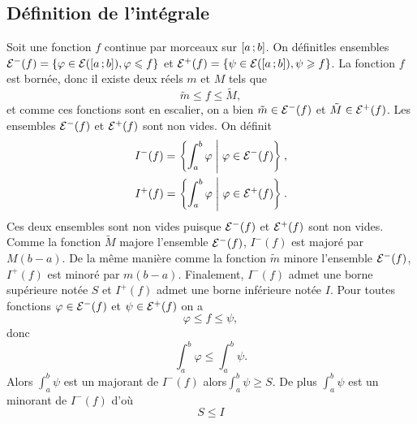 \subsection{Définition de l'intégrale}

Soit une fonction $f$ continue par morceaux sur $\left[ a \, ;  b \right]$. On définitles ensembles $\mathcal{E}^{-}(f)=\{\varphi \in \mathcal{E}(\left[ a \, ;  b \right]), \varphi \leqslant f\}$ et $\mathcal{E}^{+}(f)=\{\psi \in \mathcal{E}(\left[ a \, ;  b \right]), \psi \geqslant f\}$. La fonction $f$ est bornée, donc il existe deux réels $m$ et $M$ tels que 
\begin{equation}
  \tilde{m} \leqslant f \leqslant \tilde{M},
\end{equation}
et comme ces fonctions sont en escalier, on a bien $\tilde{m} \in \mathcal{E}^{-}(f)$ et $\tilde{M} \in \mathcal{E}^{+}(f)$. Les ensembles $\mathcal{E}^{-}(f)$ et $\mathcal{E}^{+}(f)$ sont non vides. On définit 
\begin{align}
I^{-}(f)=\left\{\int_a^b \varphi\mathrel{}\middle|\mathrel{}\varphi \in \mathcal{E}^{-}(f)\right\}, \\
I^{+}(f)=\left\{\int_a^b \varphi\mathrel{}\middle|\mathrel{}\varphi \in \mathcal{E}^{+}(f)\right\}.
\end{align}
 Ces deux ensembles sont non vides puisque $\mathcal{E}^{-}(f)$ et $\mathcal{E}^{+}(f)$ sont non vides. Comme la fonction $\tilde{M}$ majore l'ensemble $\mathcal{E}^{-}(f)$, $I^{-}(f)$ est majoré par $M(b-a)$. De la même manière comme la fonction $\tilde{m}$ minore l'ensemble $\mathcal{E}^{-}(f)$, $I^{+}(f)$ est minoré par $m(b-a)$. Finalement, $I^{-}(f)$ admet une borne supérieure notée $S$ et $I^{+}(f)$ admet une borne inférieure notée $I$. Pour toutes fonctions $\varphi \in \mathcal{E}^{-}(f)$ et $\psi \in \mathcal{E}^{+}(f)$ on a
\begin{equation}
  \varphi \leqslant f \leqslant \psi,
\end{equation}
donc
\begin{equation}
  \int_a^b \varphi \leqslant \int_a^b \psi.
\end{equation}
Alors $\int_a^b \psi$ est un majorant de $I^{-}(f)$ alors$\int_a^b \psi \geqslant S$. De plus $\int_a^b \psi$ est un minorant de $I^{-}(f)$ d'où
\begin{equation}
  S \leqslant I
\end{equation}

